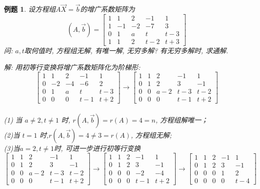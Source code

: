 \documentclass[a4paper]{book}
\newtheorem{eg}{例题}[chapter]
\begin{document}
\begin{eg}
设方程组$A\vec{X}=\vec{b}$的增广系数矩阵为
\begin{displaymath}
(A,\vec{b})=\begin{bmatrix}1&1&2&-1&1\\1&-1&-2&-7&3\\0&1&a&t&t-3\\1&1&2&t-2&t+3
\end{bmatrix}\end{displaymath}
问: $a, t$取何值时,  方程组无解, 有唯一解, 无穷多解? 有无穷多解时,  求通解.

解: 用初等行变换将增广系数矩阵化为阶梯形:
\begin{displaymath}
\begin{bmatrix}1&1&2&-1&1\\0&-2&-4&-6&2\\0&1&a&t&t-3\\0&0&0&t-1&t+2\end{bmatrix}
\rightarrow \begin{bmatrix}1&1&2&-1&1\\0&1&2&3&-1\\0&0&a-2&t-3&t-2\\0&0&0&t-1&t+2\end{bmatrix}
\end{displaymath}
\\(1) 当 $a\not=2, t \not=1$ 时, $r(A,\vec{b})=r(A)=4=n$,  方程组解唯一；\\
(2)当 $t = 1$ 时,$r(A, \vec{b})=4\not=3=r(A)$,  方程组无解;\\
(3)当$a=2, t \not=1$时, 可进一步进行初等行变换
\begin{displaymath}
\begin{bmatrix}1&1&2&-1&1\\0&1&2&3&-1\\0&0&a-2&t-3&t-2\\0&0&0&t-1&t+2\end{bmatrix}
\rightarrow\begin{bmatrix} 1&1&2&-1&1\\0&1&2&3&-1\\0&0&0&-2&-4\\0&0&0&t-1&t+2\end{bmatrix}\rightarrow
\begin{bmatrix} 1&1&2&-1&1\\0&1&2&3&-1\\0&0&0&1&2\\0&0&0&0&t-4\end{bmatrix}\end{displaymath}

\end{eg}
\end{document}
